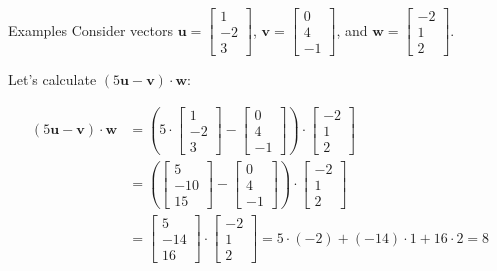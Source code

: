 \documentclass{beamer}
\begin{document}
\begin{frame}{Examples}
  Consider vectors \( \mathbf{u} = \begin{bmatrix} 1 \\ -2 \\ 3 \end{bmatrix} \), \( \mathbf{v} = \begin{bmatrix} 0 \\ 4 \\ -1 \end{bmatrix} \), and \( \mathbf{w} = \begin{bmatrix} -2 \\ 1 \\ 2 \end{bmatrix} \).

  Let's calculate \( (5\mathbf{u} - \mathbf{v}) \cdot \mathbf{w} \):

  \pause  
  \begin{align*}
      (5\mathbf{u} - \mathbf{v}) \cdot \mathbf{w} &= \left(5\cdot\begin{bmatrix} 1 \\ -2 \\ 3 \end{bmatrix} - \begin{bmatrix} 0 \\ 4 \\ -1 \end{bmatrix}\right) \cdot \begin{bmatrix} -2 \\ 1 \\ 2 \end{bmatrix} \\&= \left(\begin{bmatrix} 5 \\ -10 \\ 15 \end{bmatrix} - \begin{bmatrix} 0 \\ 4 \\ -1 \end{bmatrix}\right) \cdot \begin{bmatrix} -2 \\ 1 \\ 2 \end{bmatrix} 
      \\&= \begin{bmatrix} 5 \\ -14 \\ 16 \end{bmatrix} \cdot \begin{bmatrix} -2 \\ 1 \\ 2 \end{bmatrix} = 5 \cdot (-2) + (-14) \cdot 1 + 16 \cdot 2 = 8  \end{align*}
    
\end{frame}
\end{document}
